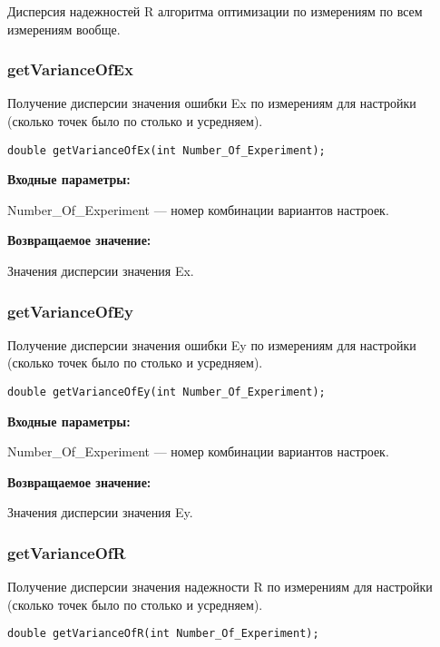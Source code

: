 \documentclass[a4paper,12pt]{article}
\begin{document}
Дисперсия надежностей R алгоритма оптимизации по измерениям по всем измерениям вообще.


\subsubsection{getVarianceOfEx}\label{getVarianceOfEx}

Получение дисперсии значения ошибки Ex по измерениям для настройки (сколько точек было по столько и усредняем).


\begin{lstlisting}[label=code_syntax_getVarianceOfEx,caption=Синтаксис]
double getVarianceOfEx(int Number_Of_Experiment);
\end{lstlisting}

\textbf{Входные параметры:}

Number\_Of\_Experiment --- номер комбинации вариантов настроек.

\textbf{Возвращаемое значение:}

Значения дисперсии значения Ex.


\subsubsection{getVarianceOfEy}\label{getVarianceOfEy}

Получение дисперсии значения ошибки Ey по измерениям для настройки (сколько точек было по столько и усредняем).


\begin{lstlisting}[label=code_syntax_getVarianceOfEy,caption=Синтаксис]
double getVarianceOfEy(int Number_Of_Experiment);
\end{lstlisting}

\textbf{Входные параметры:}

Number\_Of\_Experiment --- номер комбинации вариантов настроек.

\textbf{Возвращаемое значение:}

Значения дисперсии значения Ey.


\subsubsection{getVarianceOfR}\label{getVarianceOfR}

Получение дисперсии значения надежности R по измерениям для настройки (сколько точек было по столько и усредняем).


\begin{lstlisting}[label=code_syntax_getVarianceOfR,caption=Синтаксис]
double getVarianceOfR(int Number_Of_Experiment);
\end{lstlisting}
\end{document}
